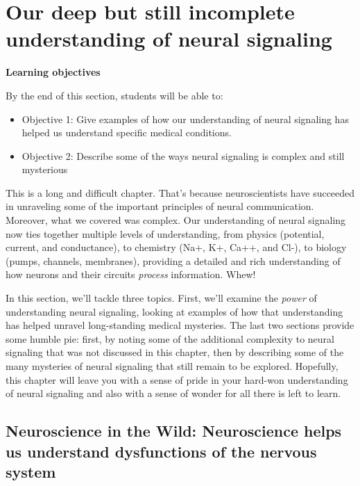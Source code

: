 \documentclass[
]{book}
\begin{document}
\hypertarget{neurophysiology-wrapup}{%
\section{Our deep but still incomplete understanding of neural signaling}\label{neurophysiology-wrapup}}

\textbf{Learning objectives}

By the end of this section, students will be able to:

\begin{itemize}
\item
  Objective 1: Give examples of how our understanding of neural signaling has helped us understand specific medical conditions.
\item
  Objective 2: Describe some of the ways neural signaling is complex and still mysterious
\end{itemize}

This is a long and difficult chapter. That's because neuroscientists have succeeded in unraveling some of the important principles of neural communication. Moreover, what we covered was complex. Our understanding of neural signaling now ties together multiple levels of understanding, from physics (potential, current, and conductance), to chemistry (Na+, K+, Ca++, and Cl-), to biology (pumps, channels, membranes), providing a detailed and rich understanding of how neurons and their circuits \emph{process} information. Whew!

In this section, we'll tackle three topics. First, we'll examine the \emph{power} of understanding neural signaling, looking at examples of how that understanding has helped unravel long-standing medical mysteries. The last two sections provide some humble pie: first, by noting some of the additional complexity to neural signaling that was not discussed in this chapter, then by describing some of the many mysteries of neural signaling that still remain to be explored. Hopefully, this chapter will leave you with a sense of pride in your hard-won understanding of neural signaling and also with a sense of wonder for all there is left to learn.

\hypertarget{neuroscience-in-the-wild-neuroscience-helps-us-understand-dysfunctions-of-the-nervous-system}{%
\subsection{Neuroscience in the Wild: Neuroscience helps us understand dysfunctions of the nervous system}\label{neuroscience-in-the-wild-neuroscience-helps-us-understand-dysfunctions-of-the-nervous-system}}
\end{document}
